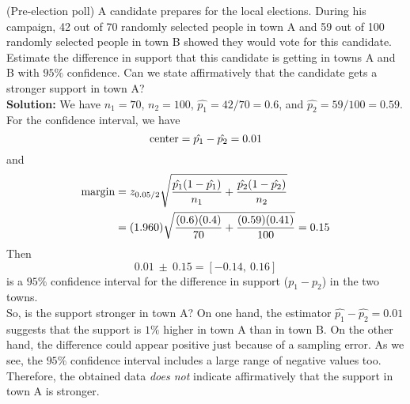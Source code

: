 \begin{example}{ (Pre-election poll)}
  A candidate prepares for the local elections. During his campaign, 42 out of 70 randomly selected people in town A and 59 out of 100 randomly selected people in town B showed they would vote for this candidate. Estimate the difference in support that this candidate is getting in towns A and B with $95\%$ confidence. Can we state affirmatively that the candidate gets a stronger support in town A? \\

  \textbf{Solution:}
  We have $n_1 = 70$, $n_2 = 100$, $\hat{p_1} = 42/70 = 0.6$, and $\hat{p_2} = 59/100 = 0.59$. For the confidence interval, we have
  \begin{equation*}
    \textnormal{center} = \hat{p_1} - \hat{p_2} = 0.01
  \end{equation*}
  and
  \begin{align*}
    \textnormal{margin} &= z_{0.05/2} \sqrt{\frac{\hat{p_1} (1 - \hat{p_1})}{n_1} + \frac{\hat{p_2} (1 - \hat{p_2})}{n_2}}\\
    &= (1.960) \sqrt{\frac{(0.6) (0.4)}{70} + \frac{(0.59) (0.41)}{100}} = 0.15
  \end{align*}
  Then
  \begin{equation*}
    0.01 \ \pm \ 0.15 = \left[ -0.14,\ 0.16 \right]
  \end{equation*}
  is a $95\%$ confidence interval for the difference in support ($p_1 - p_2$) in the two towns.\\

  So, is the support stronger in town A? On one hand, the estimator $\hat{p_1} - \hat{p_2} = 0.01$ suggests that the support is $1\%$ higher in town A than in town B. On the other hand, the difference could appear positive just because of a sampling error. As we see, the $95\%$ confidence interval includes a large range of negative values too. Therefore, the obtained data \textit{does not} indicate affirmatively that the support in town A is stronger.
\end{example}
